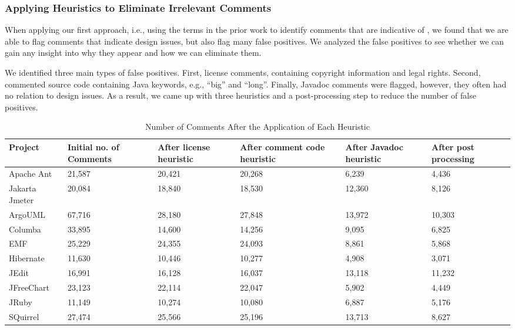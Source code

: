\subsubsection{Applying Heuristics to Eliminate Irrelevant Comments}

When applying our first approach, i.e., using the terms in the prior work to identify comments that are indicative of \SADTD, we found that we are able to flag comments that indicate design issues, but also flag many false positives. We analyzed the false positives to see whether we can gain any insight into why they appear and how we can eliminate them. 

We identified three main types of false positives. First, license comments, containing copyright information and legal rights. Second, commented source code containing Java keywords, e.g., ``big'' and ``long''. Finally, Javadoc comments were flagged, however, they often had no relation to design issues. As a result, we came up with three heuristics and a post-processing step to reduce the number of false positives.

\begin{table*}[!hbt]
    \begin{center}
        \caption{Number of Comments After the Application of Each Heuristic}
        \vspace{-2mm}
        \label{tab:heuristicDetails}
        \begin{tabular}{l| p{.6in} p{.6in} p{.8in} p{.7in} p{.55in}} 
            \toprule
            \textbf{Project} &  \textbf{Initial no. of Comments} & \textbf{After license heuristic} &  \textbf{After comment code heuristic}  &  \textbf{After Javadoc heuristic} & \textbf{After post processing} \\ 
            \midrule
            Apache Ant & 21,587 & 20,421 & 20,268 & 6,239 & 4,436 \\ 
            Jakarta Jmeter & 20,084& 18,840 & 18,530 & 12,360 & 8,126 \\
            ArgoUML & 67,716 & 28,180 & 27,848 & 13,972 & 10,303 \\
            Columba & 33,895 & 14,600 & 14,256 & 9,095 & 6,825 \\
            EMF & 25,229 & 24,355 & 24,093 & 8,861 & 5,868 \\
            Hibernate  & 11,630 & 10,446 & 10,277 & 4,908 & 3,071 \\
            JEdit & 16,991 & 16,128 & 16,037 & 13,118 & 11,232 \\
            JFreeChart & 23,123 & 22,114 & 22,047 & 5,902 & 4,449 \\
            JRuby & 11,149 & 10,274 & 10,080 & 6,887 & 5,176 \\
            SQuirrel  & 27,474& 25,566 & 25,196 & 13,713 & 8,627 \\  
            \bottomrule
        \end{tabular}
    \end{center}
\end{table*}
  
